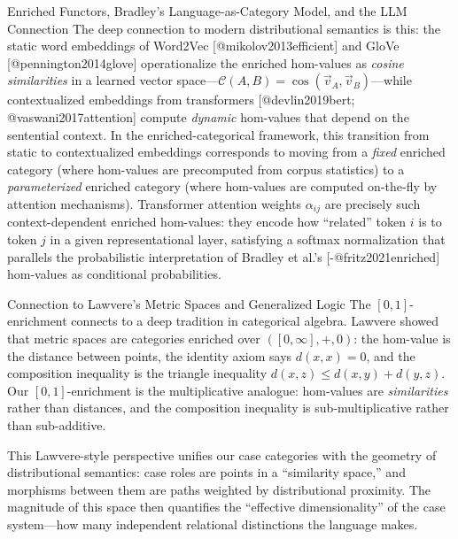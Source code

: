 \documentclass[
  ignorenonframetext,
]{beamer}
\begin{document}
\begin{frame}{Enriched Functors, Bradley's Language-as-Category Model,
and the LLM Connection}
The deep connection to modern distributional semantics is this: the
static word embeddings of Word2Vec {[}@mikolov2013efficient{]} and GloVe
{[}@pennington2014glove{]} operationalize the enriched hom-values as
\emph{cosine similarities} in a learned vector
space---\(\mathcal{C}(A, B) = \cos(\vec{v}_A, \vec{v}_B)\)---while
contextualized embeddings from transformers {[}@devlin2019bert;
@vaswani2017attention{]} compute \emph{dynamic} hom-values that depend
on the sentential context. In the enriched-categorical framework, this
transition from static to contextualized embeddings corresponds to
moving from a \emph{fixed} enriched category (where hom-values are
precomputed from corpus statistics) to a \emph{parameterized} enriched
category (where hom-values are computed on-the-fly by attention
mechanisms). Transformer attention weights \(\alpha_{ij}\) are precisely
such context-dependent enriched hom-values: they encode how ``related''
token \(i\) is to token \(j\) in a given representational layer,
satisfying a softmax normalization that parallels the probabilistic
interpretation of Bradley et al.'s {[}-@fritz2021enriched{]} hom-values
as conditional probabilities.
\end{frame}

\begin{frame}{Connection to Lawvere's Metric Spaces and Generalized
Logic}
\protect{}\label{connection-to-lawveres-metric-spaces-and-generalized-logic}
The \([0,1]\)-enrichment connects to a deep tradition in categorical
algebra. Lawvere showed that metric spaces are categories enriched over
\(([0, \infty], +, 0)\): the hom-value is the distance between points,
the identity axiom says \(d(x, x) = 0\), and the composition inequality
is the triangle inequality \(d(x, z) \leq d(x, y) + d(y, z)\). Our
\([0,1]\)-enrichment is the multiplicative analogue: hom-values are
\emph{similarities} rather than distances, and the composition
inequality is sub-multiplicative rather than sub-additive.

This Lawvere-style perspective unifies our case categories with the
geometry of distributional semantics: case roles are points in a
``similarity space,'' and morphisms between them are paths weighted by
distributional proximity. The magnitude of this space then quantifies
the ``effective dimensionality'' of the case system---how many
independent relational distinctions the language makes.
\end{frame}
\end{document}
